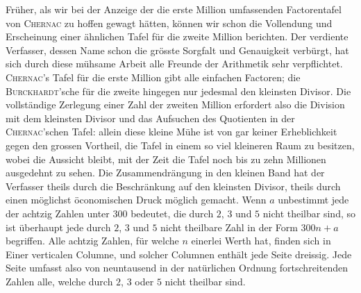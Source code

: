 Früher, als wir bei der Anzeige der die erste Million umfassenden Factorentafel von \textsc{Chernac} zu hoffen gewagt hätten, können wir schon die Vollendung und Erscheinung einer ähnlichen Tafel für die zweite Million berichten. Der verdiente Verfasser, dessen Name schon die grösste Sorgfalt und Genauigkeit verbürgt, hat sich durch diese mühsame Arbeit alle Freunde der Arithmetik sehr verpflichtet. \textsc{Chernac}'s Tafel für die erste Million gibt alle einfachen Factoren; die \textsc{Burckhardt}'sche für die zweite hingegen nur jedesmal den kleinsten Divisor. Die vollständige Zerlegung einer Zahl der zweiten Million erfordert also die Division mit dem kleinsten Divisor und das Aufsuchen des Quotienten in der \textsc{Chernac}'schen Tafel: allein diese kleine Mühe ist von gar keiner Erheblichkeit gegen den grossen Vortheil, die Tafel in einem so viel kleineren Raum zu besitzen, wobei die Aussicht bleibt, mit der Zeit die Tafel noch bis zu zehn Millionen ausgedehnt zu sehen. Die Zusammendrängung in den kleinen Band hat der Verfasser theils durch die Beschränkung auf den kleinsten Divisor, theils durch einen möglichst öconomischen Druck möglich gemacht. Wenn $a$ unbestimmt jede der achtzig Zahlen unter $300$ bedeutet, die durch $2$, $3$ und $5$ nicht theilbar sind, so ist überhaupt jede durch $2$, $3$ und $5$ nicht theilbare Zahl in der Form $300n+a$ begriffen. Alle achtzig Zahlen, für welche $n$ einerlei Werth hat, finden sich in Einer verticalen Columne, und solcher Columnen enthält jede Seite dreissig. Jede Seite umfasst also von neuntausend in der natürlichen Ordnung fortschreitenden Zahlen alle, welche durch $2$, $3$ oder $5$ nicht theilbar sind.

